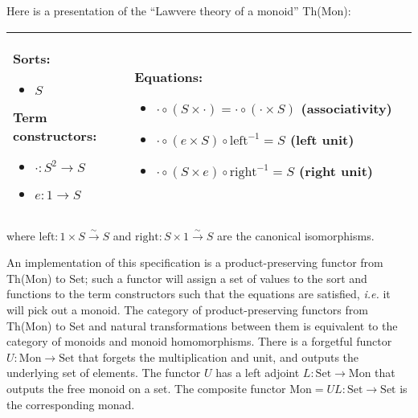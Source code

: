 \documentclass{llncs}
\newcommand{\maps}{\colon}
\newcommand{\Set}{\mathrm{Set}}
\newcommand{\Mon}{\mathrm{Mon}}
\newcommand{\leftu}{\mathrm{left}}
\newcommand{\rightu}{\mathrm{right}}
\begin{document}
Here is a presentation of the ``Lawvere theory of a monoid'' Th(Mon):
\begin{center}
  \begin{longtable}{|p{0.3\linewidth}|p{0.7\linewidth}|}
    \hline
      Sorts:
      \begin{itemize}
        \item $S$
      \end{itemize}\bigskip
      Term constructors:
      \begin{itemize}
        \item $\cdot\maps S^2 \to S$
        \item $e\maps 1 \to S$
      \end{itemize}
    &
      Equations:
      \begin{itemize}
        \item $\cdot \circ (S \times \cdot) = \cdot \circ (\cdot \times S)$ (associativity)
        \item $\cdot \circ (e \times S) \circ \leftu^{-1} = S$ (left unit)
        \item $\cdot \circ (S \times e) \circ \rightu^{-1} = S$ (right unit)        
      \end{itemize}\\
    \hline
  \end{longtable}
\end{center}
where ${\leftu\maps 1 \times S \stackrel{\sim}{\to} S}$ and ${\rightu\maps S \times 1 \stackrel{\sim}{\to} S}$ are the canonical isomorphisms.

An implementation of this specification is a product-preserving functor from Th(Mon) to Set; such a functor will assign a set of values to the sort and functions to the term constructors such that the equations are satisfied, {\em i.e.} it will pick out a monoid.  The category of product-preserving functors from Th(Mon) to Set and natural transformations between them is equivalent to the category of monoids and monoid homomorphisms.  There is a forgetful functor $U\maps \Mon \to \Set$ that forgets the multiplication and unit, and outputs the underlying set of elements.  The functor $U$ has a left adjoint $L\maps \Set \to \Mon$ that outputs the free monoid on a set.  The composite functor $\Mon = UL\maps \Set \to \Set$ is the corresponding monad.
\end{document}
